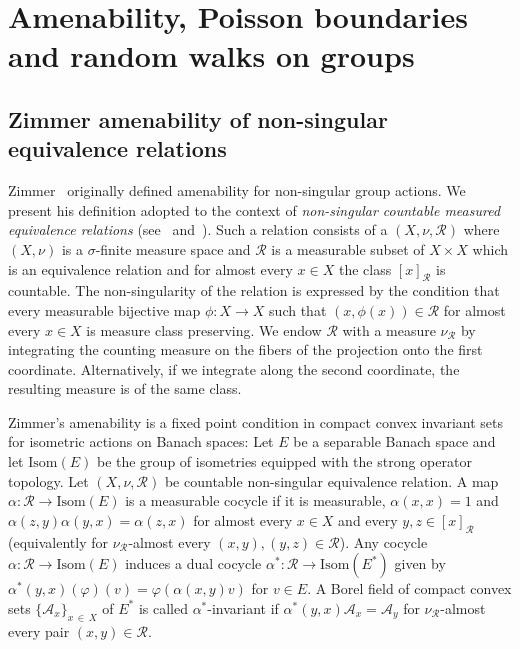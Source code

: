 \documentclass[10pt]{amsart}
\theoremstyle{definition}\newtheorem{defi}[theo]{Definition}\newtheorem{rema}[theo]{Remark}\newtheorem{exam}[theo]{Example}\newtheorem{exem}[theo]{Example}\newtheorem{nota}[theo]{Notation}
\newcommand{\calR}{\mathcal{R}}
\newcommand{\calA}{\mathcal{A}}
\newcommand{\Isom}{\mathrm{Isom}}
\begin{document}
\section{Amenability, Poisson boundaries and random walks on groups} \label{sec:poisson}

\subsection{Zimmer amenability of non-singular equivalence relations}\label{sec:zimmer-amenability}


Zimmer~\cite{Zimmer78} originally defined amenability for non-singular group actions. We present his definition adopted to the context of \emph{non-singular countable measured equivalence relations} (see~\cite{Adams90} and~\cite{ConnesFeldmanWeiss}). Such a relation consists of a $(X,\nu,\calR)$ where $(X,\nu)$ is a $\sigma$-finite measure space and $\calR$ is a measurable subset of $X\times X$ which is an equivalence relation and for almost every $x\in X$ the class $[x]_\calR$ is countable. The non-singularity of the relation is expressed by the condition that every measurable bijective map $\phi\colon X\to X$ such that $(x,\phi(x))\in \calR$ for almost every $x\in X$ is measure class preserving. We endow $\calR$ with a measure $\nu_{\calR}$ by integrating the counting measure on the fibers of the projection onto the first coordinate. Alternatively, if we integrate along the second coordinate, the resulting measure is of the same class.

Zimmer's amenability is a fixed point condition in compact convex invariant sets for isometric actions on Banach spaces: Let $E$ be a separable Banach space and let $\Isom(E)$ be the group of isometries equipped with the strong operator topology. Let $(X,\nu,\calR)$ be countable non-singular equivalence relation. A map $\alpha\colon\calR\to \Isom(E)$ is a measurable cocycle if it is measurable, $\alpha(x,x)=1$ and $\alpha(z,y)\alpha(y,x)=\alpha(z,x)$ for almost every $x\in X$ and every $y,z\in [x]_\calR$ (equivalently for $\nu_{\calR}$-almost every $(x,y),(y,z)\in \calR$). Any cocycle $\alpha\colon \calR\to \Isom(E)$ induces a dual cocycle $\alpha^*\colon \calR\to \Isom(E^*)$ given by $\alpha^*(y,x)(\varphi)(v)=\varphi(\alpha(x,y)v)$ for $v\in E.$ A Borel field of compact convex sets $\{\calA_x\}_{x\,\in\,X}$ of $E^*$ is called $\alpha^*$-invariant if $\alpha^*(y,x)\calA_x=\calA_y$ for $\nu_\calR$-almost every pair $(x,y)\in\calR$.
\end{document}

